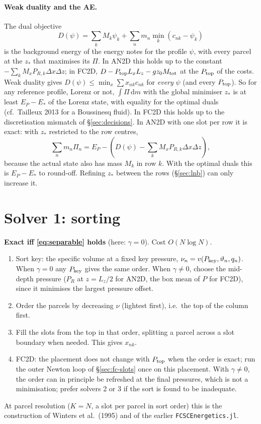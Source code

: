 \documentclass[11pt,a4paper]{article}
\newcommand{\vt}{\vartheta}
\newcommand{\code}[1]{\texttt{#1}}
\newcommand{\Mtot}{M_{\rm tot}}
\newcommand{\Ptop}{P_{\rm top}}
\newcommand{\zs}{z_{*}}
\begin{document}
\paragraph{Weak duality and the AE.} The dual objective
\begin{equation}
  D(\psi)=\sum_kM_k\psi_k+\sum_nm_n\min_k\left(c_{nk}-\psi_k\right)
  \label{eq:dual-objective}
\end{equation}
is the background energy of the energy notes for the profile $\psi$, with every parcel at the $\zs$ that maximises its $\Pi$.
In AN2D this holds up to the constant $-\sum_kM_xP_{R,k}\Delta x\Delta z$; in FC2D, $D-\Ptop L_xL_z-gz_0\Mtot$ at the $\Ptop$ of
the costs. Weak duality gives $D(\psi)\le\min_x\sum x_{nk}c_{nk}$ for \emph{every} $\psi$ (and every $\Ptop$). So for any
reference profile, Lorenz or not, $\int\Pi\,\mathrm{d}m$ with the global minimiser $\zs$ is at least $E_P-E_*$ of the Lorenz state,
with equality for the optimal duals (cf.\ Tailleux 2013 for a Boussinesq fluid). In FC2D this holds up to the discretisation
mismatch of \S\ref{sec:decisions}. In AN2D with one slot per row it is exact: with $\zs$ restricted to the row centres,
\begin{equation}
  \sum_nm_n\Pi_n=E_P-\left(D(\psi)-\sum_kM_xP_{R,k}\Delta x\Delta z\right),
\end{equation}
because the actual state also has mass $M_k$ in row $k$. With the optimal duals this is $E_P-E_*$ to round-off. Refining $\zs$
between the rows (\S\ref{sec:lnb}) can only increase it.

\section{Solver 1: sorting}\label{sec:sort}
\textbf{Exact iff \eqref{eq:separable} holds} (here: $\gamma=0$). Cost $O(N\log N)$.
\begin{enumerate}
  \item Sort key: the specific volume at a fixed key pressure, $\nu_n=v(P_{\rm key},\vt_n,q_n)$. When $\gamma=0$ any
        $P_{\rm key}$ gives the same order. When $\gamma\neq0$, choose the mid-depth pressure ($P_R$ at $z=L_z/2$ for AN2D,
        the box mean of $P$ for FC2D), since it minimises the largest pressure offset.
  \item Order the parcels by decreasing $\nu$ (lightest first), i.e.\ the top of the column first.
  \item Fill the slots from the top in that order, splitting a parcel across a slot boundary when needed. This gives $x_{nk}$.
  \item FC2D: the placement does not change with $\Ptop$ when the order is exact; run the outer Newton loop of
        \S\ref{sec:fc-slots} once on this placement. With $\gamma\neq0$, the order can in principle be refreshed at the final
        pressures, which is not a minimisation; prefer solvers 2 or 3 if the sort is found to be inadequate.
\end{enumerate}
At parcel resolution ($K=N$, a slot per parcel in sort order) this is the construction of Winters et al.\ (1995) and of
the earlier \code{FCSCEnergetics.jl}.
\end{document}
